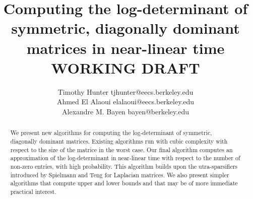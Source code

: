 \documentclass[onefignum,onetabnum]{siamltex1213}
\title{Computing the log-determinant of symmetric, diagonally dominant matrices
in near-linear time\\
WORKING DRAFT}
\author{Timothy Hunter \email tjhunter@eecs.berkeley.edu \\
Ahmed {El Alaoui} \email elalaoui@eecs.berkeley.edu\\
Alexandre M. Bayen \email bayen@berkeley.edu}
\begin{document}
\maketitle

\begin{abstract}
We present new algorithms for computing the log-determinant of symmetric,
diagonally dominant matrices. Existing algorithms run with cubic complexity
with respect to the size of the matrice in the worst case. Our final algorithm 
computes an approximation of the log-determinant in near-linear time with 
respect to the number of non-zero entries, with high probability. This 
algorithm builds upon the utra-sparsifiers introduced by Spielmann and Teng for
Laplacian matrices. We also present simpler algorithms that compute upper and 
lower bounds and that may be of more immediate practical interest.
\end{abstract}

\begin{keywords}\end{keywords}

\begin{AMS}\end{AMS}


\pagestyle{myheadings}

\thispagestyle{plain}














% 

% 
\end{document}

